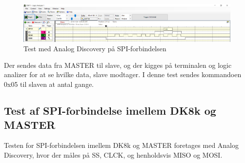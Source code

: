 \begin{figure}[H]
\includegraphics[scale=0.9]{Screenshots/Logic_analyzer}
\caption{Test med Analog Discovery på SPI-forbindelsen}
\end{figure}

Der sendes data fra MASTER til slave, og der kigges på terminalen og logic analizer for at se hvilke data, slave modtager. I denne test sendes kommandoen 0x05 til 
slaven at antal gange.

\subsection{Test af SPI-forbindelse imellem DK8k og MASTER}

Testen for SPI-forbindelsen imellem DK8k og MASTER foretages med Analog Discovery, hvor der måles på SS, CLCK, og henholdsvis MISO og MOSI.

